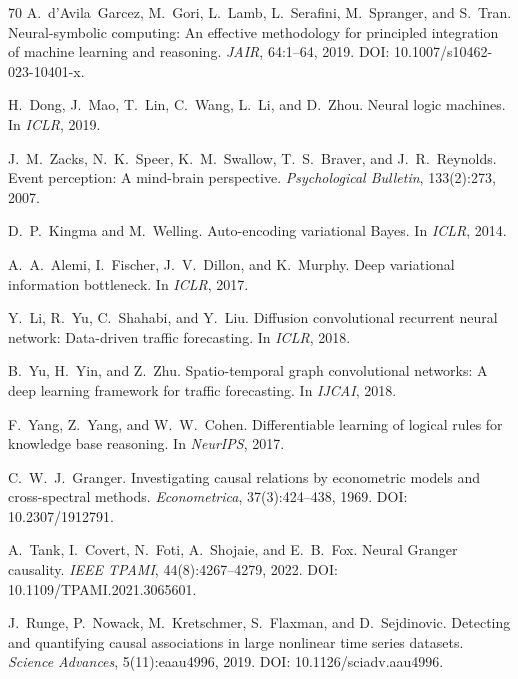 \documentclass[11pt]{article}
\begin{document}
\begin{thebibliography}{70}
A.~d'Avila~Garcez, M.~Gori, L.~Lamb, L.~Serafini, M.~Spranger, and S.~Tran.
\newblock Neural-symbolic computing: An effective methodology for principled integration of machine learning and reasoning.
\newblock \emph{JAIR}, 64:1--64, 2019.
\newblock DOI: 10.1007/s10462-023-10401-x.

H.~Dong, J.~Mao, T.~Lin, C.~Wang, L.~Li, and D.~Zhou.
\newblock Neural logic machines.
\newblock In \emph{ICLR}, 2019.

J.~M.~Zacks, N.~K.~Speer, K.~M.~Swallow, T.~S.~Braver, and J.~R.~Reynolds.
\newblock Event perception: A mind-brain perspective.
\newblock \emph{Psychological Bulletin}, 133(2):273, 2007.

D.~P.~Kingma and M.~Welling.
\newblock Auto-encoding variational Bayes.
\newblock In \emph{ICLR}, 2014.

A.~A.~Alemi, I.~Fischer, J.~V.~Dillon, and K.~Murphy.
\newblock Deep variational information bottleneck.
\newblock In \emph{ICLR}, 2017.

Y.~Li, R.~Yu, C.~Shahabi, and Y.~Liu.
\newblock Diffusion convolutional recurrent neural network: Data-driven traffic forecasting.
\newblock In \emph{ICLR}, 2018.

B.~Yu, H.~Yin, and Z.~Zhu.
\newblock Spatio-temporal graph convolutional networks: A deep learning framework for traffic forecasting.
\newblock In \emph{IJCAI}, 2018.

F.~Yang, Z.~Yang, and W.~W.~Cohen.
\newblock Differentiable learning of logical rules for knowledge base reasoning.
\newblock In \emph{NeurIPS}, 2017.

C.~W.~J.~Granger.
\newblock Investigating causal relations by econometric models and cross-spectral methods.
\newblock \emph{Econometrica}, 37(3):424--438, 1969. DOI: 10.2307/1912791.

A.~Tank, I.~Covert, N.~Foti, A.~Shojaie, and E.~B.~Fox.
\newblock Neural Granger causality.
\newblock \emph{IEEE TPAMI}, 44(8):4267--4279, 2022. DOI: 10.1109/TPAMI.2021.3065601.

J.~Runge, P.~Nowack, M.~Kretschmer, S.~Flaxman, and D.~Sejdinovic.
\newblock Detecting and quantifying causal associations in large nonlinear time series datasets.
\newblock \emph{Science Advances}, 5(11):eaau4996, 2019. DOI: 10.1126/sciadv.aau4996.


\end{thebibliography}
\end{document}
